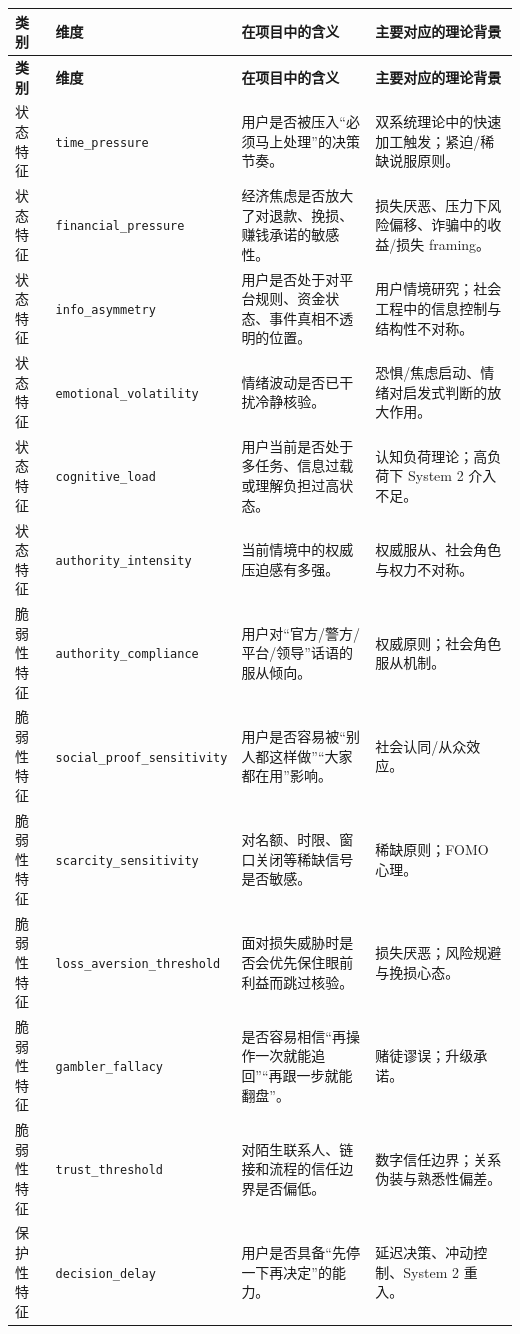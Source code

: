 \documentclass[12pt,a4paper]{ctexart}
\begin{document}
\begin{longtable}{p{}p{}p{}p{}}
\toprule
\textbf{类别} & \textbf{维度} & \textbf{在项目中的含义} & \textbf{主要对应的理论背景} \\
\midrule
\endfirsthead
\toprule
\textbf{类别} & \textbf{维度} & \textbf{在项目中的含义} & \textbf{主要对应的理论背景} \\
\midrule
\endhead
状态特征 & \texttt{time\_pressure} & 用户是否被压入“必须马上处理”的决策节奏。 & 双系统理论中的快速加工触发；紧迫/稀缺说服原则。 \\
状态特征 & \texttt{financial\_pressure} & 经济焦虑是否放大了对退款、挽损、赚钱承诺的敏感性。 & 损失厌恶、压力下风险偏移、诈骗中的收益/损失 framing。 \\
状态特征 & \texttt{info\_asymmetry} & 用户是否处于对平台规则、资金状态、事件真相不透明的位置。 & 用户情境研究；社会工程中的信息控制与结构性不对称。 \\
状态特征 & \texttt{emotional\_volatility} & 情绪波动是否已干扰冷静核验。 & 恐惧/焦虑启动、情绪对启发式判断的放大作用。 \\
状态特征 & \texttt{cognitive\_load} & 用户当前是否处于多任务、信息过载或理解负担过高状态。 & 认知负荷理论；高负荷下 System 2 介入不足。 \\
状态特征 & \texttt{authority\_intensity} & 当前情境中的权威压迫感有多强。 & 权威服从、社会角色与权力不对称。 \\
脆弱性特征 & \texttt{authority\_compliance} & 用户对“官方/警方/平台/领导”话语的服从倾向。 & 权威原则；社会角色服从机制。 \\
脆弱性特征 & \texttt{social\_proof\_sensitivity} & 用户是否容易被“别人都这样做”“大家都在用”影响。 & 社会认同/从众效应。 \\
脆弱性特征 & \texttt{scarcity\_sensitivity} & 对名额、时限、窗口关闭等稀缺信号是否敏感。 & 稀缺原则；FOMO 心理。 \\
脆弱性特征 & \texttt{loss\_aversion\_threshold} & 面对损失威胁时是否会优先保住眼前利益而跳过核验。 & 损失厌恶；风险规避与挽损心态。 \\
脆弱性特征 & \texttt{gambler\_fallacy} & 是否容易相信“再操作一次就能追回”“再跟一步就能翻盘”。 & 赌徒谬误；升级承诺。 \\
脆弱性特征 & \texttt{trust\_threshold} & 对陌生联系人、链接和流程的信任边界是否偏低。 & 数字信任边界；关系伪装与熟悉性偏差。 \\
保护性特征 & \texttt{decision\_delay} & 用户是否具备“先停一下再决定”的能力。 & 延迟决策、冲动控制、System 2 重入。 \\

\end{longtable}
\end{document}
